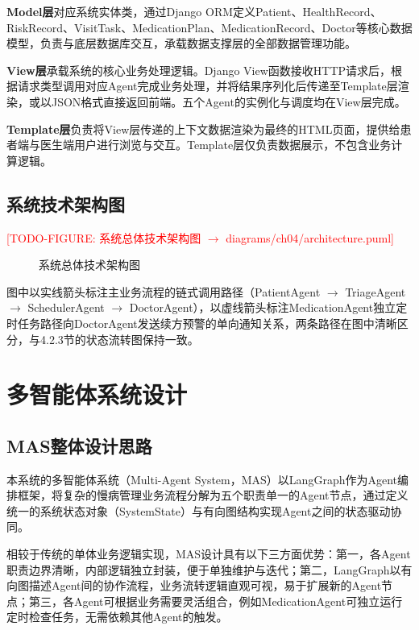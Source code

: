 \textbf{Model层}对应系统实体类，通过Django ORM定义Patient、HealthRecord、RiskRecord、VisitTask、MedicationPlan、MedicationRecord、Doctor等核心数据模型，负责与底层数据库交互，承载数据支撑层的全部数据管理功能。

\textbf{View层}承载系统的核心业务处理逻辑。Django View函数接收HTTP请求后，根据请求类型调用对应Agent完成业务处理，并将结果序列化后传递至Template层渲染，或以JSON格式直接返回前端。五个Agent的实例化与调度均在View层完成。

\textbf{Template层}负责将View层传递的上下文数据渲染为最终的HTML页面，提供给患者端与医生端用户进行浏览与交互。Template层仅负责数据展示，不包含业务计算逻辑。


\subsection{系统技术架构图}

\todofig{}
\textcolor{red}{[TODO-FIGURE: 系统总体技术架构图 $\rightarrow$ diagrams/ch04/architecture.puml]}
\begin{figure}[H]
\centering
\caption{系统总体技术架构图}
\label{fig:bce-tech-mapping}
\end{figure}

图中以实线箭头标注主业务流程的链式调用路径（PatientAgent $\rightarrow$ TriageAgent $\rightarrow$ SchedulerAgent $\rightarrow$ DoctorAgent），以虚线箭头标注MedicationAgent独立定时任务路径向DoctorAgent发送续方预警的单向通知关系，两条路径在图中清晰区分，与4.2.3节的状态流转图保持一致。


\section{多智能体系统设计}

\subsection{MAS整体设计思路}

本系统的多智能体系统（Multi-Agent System，MAS）以LangGraph作为Agent编排框架，将复杂的慢病管理业务流程分解为五个职责单一的Agent节点，通过定义统一的系统状态对象（SystemState）与有向图结构实现Agent之间的状态驱动协同。

相较于传统的单体业务逻辑实现，MAS设计具有以下三方面优势：第一，各Agent职责边界清晰，内部逻辑独立封装，便于单独维护与迭代；第二，LangGraph以有向图描述Agent间的协作流程，业务流转逻辑直观可视，易于扩展新的Agent节点；第三，各Agent可根据业务需要灵活组合，例如MedicationAgent可独立运行定时检查任务，无需依赖其他Agent的触发。

